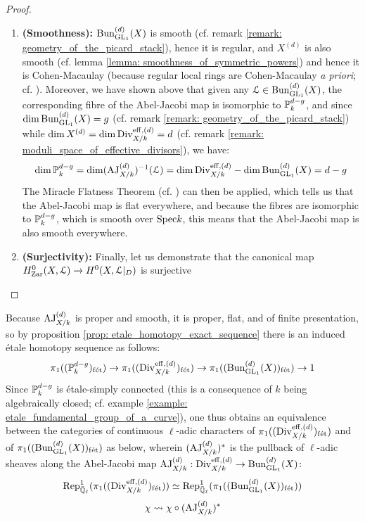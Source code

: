 \begin{proof}
\begin{enumerate}
                            \item \textbf{(Smoothness):} $\Bun_{\GL_1}^{(d)}(X)$ is smooth (cf. remark \ref{remark: geometry_of_the_picard_stack}), hence it is regular, and $X^{(d)}$ is also smooth (cf. lemma \ref{lemma: smoothness_of_symmetric_powers}) and hence it is Cohen-Macaulay (because regular local rings are Cohen-Macaulay \textit{a priori}; cf. \cite[\href{https://stacks.math.columbia.edu/tag/00NQ}{Tag 00NQ}]{stacks}). Moreover, we have shown above that given any $\calL \in \Bun_{\GL_1}^{(d)}(X)$, the corresponding fibre of the Abel-Jacobi map is isomorphic to $\P^{d - g}_k$, and since $\dim \Bun_{\GL_1}^{(d)}(X) = g$ (cf. remark \ref{remark: geometry_of_the_picard_stack}) while $\dim X^{(d)} = \dim \Div_{X/k}^{\eff, (d)} = d$ (cf. remark \ref{remark: moduli_space_of_effective_divisors}), we have:
                                $$\dim \P^{d - g}_k = \dim (\AJ_{X/k}^{(d)})^{-1}(\calL) = \dim \Div_{X/k}^{\eff, (d)} - \dim \Bun_{\GL_1}^{(d)}(X) = d - g$$
                            The Miracle Flatness Theorem (cf. \cite[\href{https://stacks.math.columbia.edu/tag/00R4}{Tag 00R4}]{stacks}) can then be applied, which tells us that the Abel-Jacobi map is flat everywhere, and because the fibres are isomorphic to $\P^{d - g}_k$, which is smooth over $\Spec k$, this means that the Abel-Jacobi map is also smooth everywhere.
                            \item \textbf{(Surjectivity):} Finally, let us demonstrate that the canonical map $H^0_{\Zar}(X, \calL) \to H^0(X, \calL|_D)$ is surjective
                        \end{enumerate}
                \end{proof}
            \begin{corollary} \label{coro: unramified_galois_representations_induced_by_the_abel_jacobi_map}
                Because $\AJ_{X/k}^{(d)}$ is proper and smooth, it is proper, flat, and of finite presentation, so by proposition \ref{prop: etale_homotopy_exact_sequence} there is an induced \'etale homotopy sequence as follows:
                    $$\pi_1((\P^{d - g}_k)_{\fet}) \to \pi_1((\Div_{X/k}^{\eff, (d)})_{\fet}) \to \pi_1((\Bun_{\GL_1}^{(d)}(X))_{\fet}) \to 1$$
                Since $\P^{d - g}_k$ is \'etale-simply connected (this is a consequence of $k$ being algebraically closed; cf. example \ref{example: etale_fundamental_group_of_a_curve}), one thus obtains an equivalence between the categories of continuous $\ell$-adic characters of $\pi_1((\Div_{X/k}^{\eff, (d)})_{\fet})$ and of $\pi_1((\Bun_{\GL_1}^{(d)}(X))_{\fet})$ as below, wherein $(\AJ_{X/k}^{(d)})^*$ is the pullback of $\ell$-adic sheaves along the Abel-Jacobi map $\AJ_{X/k}^{(d)}: \Div_{X/k}^{\eff, (d)} \to \Bun_{\GL_1}^{(d)}(X)$:
                    $$\Rep^1_{\bar{\Q}_{\ell}}(\pi_1((\Div_{X/k}^{\eff, (d)})_{\fet})) \cong \Rep^1_{\bar{\Q}_{\ell}}(\pi_1((\Bun_{\GL_1}^{(d)}(X))_{\fet}))$$
                    $$\chi \mapsto \chi \circ (\AJ_{X/k}^{(d)})^*$$
            \end{corollary}
    
